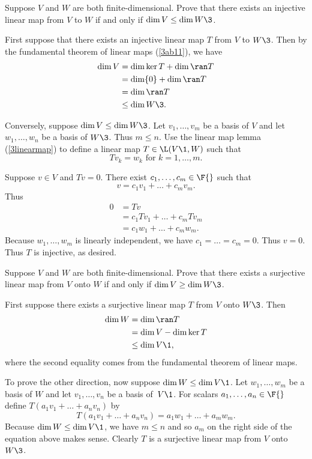 \exercise
Suppose $V$ and $W$ are both finite-dimensional.  Prove that there exists
an injective linear map from $V$ to $W$ if and only if \mbox{$\dim V \le \dim W\3$.}

\begin{Solution}
First suppose that there exists an injective linear map $T$ from $V$ to $W\3$. Then by the fundamental theorem of linear maps (\ref{3ab11}), we have
\begin{align*}
\dim V &= \dim \ker T + \dim \ran T \\
&= \dim \{0\} + \dim \ran T \\
&= \dim \ran T\\
&\le \dim W\3.
\end{align*}

Conversely, suppose $\dim V \le \dim W\3$. Let $v_1, \dots, v_m$ be a basis of $V$ and let $w_1, \dots, w_n$ be a basis of $W\3$. Thus $m \le n$. Use the linear map lemma (\ref{3linearmap}) to define a linear map $T \in \L(V\1, W)$ such that
\[
Tv_k = w_k \text{ for } k = 1, \dots, m.
\]

Suppose $v \in V$ and $Tv = 0$. There exist $c_1, \dots, c_m \in \F{}$ such that
\[
v = c_1 v_1 + \dots + c_m v_m.
\]
Thus
\begin{align*}
0 &= Tv \\
&= c_1 Tv_1 + \dots + c_m Tv_m \\
&= c_1 w_1 + \dots + c_m w_m.
\end{align*}
Because $w_1, \dots, w_m$ is linearly independent, we have $c_1 = \dots = c_m = 0$. Thus $v = 0$. Thus $T$ is injective, as desired.
\end{Solution}

\exercise
Suppose $V$ and $W$ are both finite-dimensional.  Prove that there exists
a surjective linear map from $V$ onto $W$ if and only if \mbox{$\dim V \ge \dim W\3$.}

\begin{Solution}
First suppose there exists a surjective linear map $T$ from $V$ onto $W\3$.
Then
\begin{align*}
\dim W &= \dim \ran T \\
&= \dim V - \dim \ker T \\
&\le \dim V\1,
\end{align*}
where the second equality comes from the fundamental theorem of linear maps.

To prove the other direction, now suppose $\dim W \le \dim V\1$.  Let
$w_1, \dots, w_m$ be a basis of $W$ and let $v_1, \dots, v_n$ be a basis
of~$V\1$.  For scalars $a_1, \dots, a_n \in \F{}$ define $T(a_1 v_1 + \dots + a_n v_n)$ by
\[
T(a_1 v_1 + \dots + a_n v_n) = a_1 w_1 + \dots + a_m w_m.
\]
Because $\dim W \le \dim V\1$, we have $m \le n$ and so $a_m$ on the right side
of the equation above makes sense.  Clearly $T$ is a surjective linear map from
$V$ onto~$W\3$.
\end{Solution}

